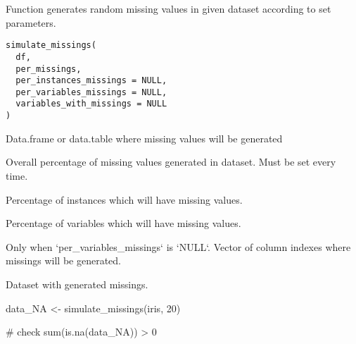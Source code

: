 \documentclass[letterpaper]{book}
\begin{document}
%
\begin{Description}\relax
Function generates random missing values in given dataset
according to set parameters.
\end{Description}
%
\begin{Usage}
\begin{verbatim}
simulate_missings(
  df,
  per_missings,
  per_instances_missings = NULL,
  per_variables_missings = NULL,
  variables_with_missings = NULL
)
\end{verbatim}
\end{Usage}
%
\begin{Arguments}
\begin{ldescription}
\item[\code{df}] Data.frame or data.table where missing values will be generated

\item[\code{per\_missings}] Overall percentage of missing values generated in dataset. Must be set every time.

\item[\code{per\_instances\_missings}] Percentage of instances which will have missing values.

\item[\code{per\_variables\_missings}] Percentage of variables which will have missing values.

\item[\code{variables\_with\_missings}] Only when `per\_variables\_missings` is `NULL`.
Vector of column indexes where missings will be generated.
\end{ldescription}
\end{Arguments}
%
\begin{Value}
Dataset with generated missings.
\end{Value}
%
\begin{Examples}
\begin{ExampleCode}
{
  data_NA <- simulate_missings(iris, 20)

  # check
  sum(is.na(data_NA)) > 0
}
\end{ExampleCode}
\end{Examples}
\printindex{}
\end{document}

